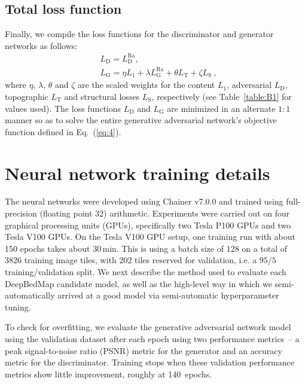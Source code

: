 \documentclass[tc, noline]{copernicus}
\begin{document}
\subsection{Total loss function}

Finally, we compile the loss functions for the discriminator and generator networks as follows:
\begin{align}
& L_{\mathrm{D}} = L_{\mathrm{D}}^{\text{Ra}}, \label{eq:A8}\\
& L_{\mathrm{G}} = \eta L_1 + \lambda L_{\mathrm{G}}^{\text{Ra}} + \theta L_{\mathrm{T}} + \zeta L_{\mathrm{S}}~, \label{eq:A9}
\end{align}
where $\eta$, $\lambda$, $\theta$ and $\zeta$ are the scaled weights for the content $L_1$, adversarial $L_{\mathrm{D}}$, topographic
$L_{\mathrm{T}}$ and structural losses $L_{\mathrm{S}}$, respectively (see Table~\ref{table:B1} for values used). The loss functions $L_{\mathrm{D}}$
and $L_{\mathrm{G}}$ are minimized in an alternate $1:1$ manner so as to solve the entire generative adversarial network's objective function defined in
Eq.~(\ref{eq:4}).


\section{Neural network training details}\label{appendix:B}

The neural networks were developed using Chainer v7.0.0 \citep{TokuiChainerDeepLearning2019} and trained using full-precision (floating point 32)
arithmetic. Experiments were carried out on four graphical processing units (GPUs), specifically two Tesla P100 GPUs and two Tesla V100 GPUs. On the Tesla V100 GPU setup, one training run with about 150 epochs takes about 30\,min. This is using a batch size of 128 on a total of 3826 training image tiles,
with 202 tiles reserved for validation, i.e. a $95/5$ training/validation split. We next describe the method used to evaluate each DeepBedMap
candidate model, as well as the high-level way in which we semi-automatically arrived at a good model via semi-automatic hyperparameter tuning.

To check for overfitting, we evaluate the generative adversarial network model using the validation dataset after each epoch using two performance
metrics~-- a peak signal-to-noise ratio (PSNR) metric for the generator and an accuracy metric for the discriminator. Training stops when these
validation performance metrics show little improvement, roughly at 140~epochs.
\end{document}
